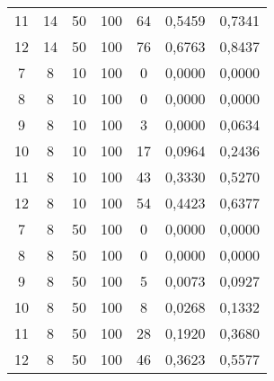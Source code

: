 \begin{table}[H]
\begin{tabular}{@{}ccccccc@{}}
11 & 14                                                    & 50                                                        & 100 & 64 & 0,5459        & 0,7341       \\
12 & 14                                                    & 50                                                        & 100 & 76 & 0,6763        & 0,8437       \\
7  & 8                                                     & 10                                                        & 100 & 0  & 0,0000        & 0,0000       \\
8  & 8                                                     & 10                                                        & 100 & 0  & 0,0000        & 0,0000       \\
9  & 8                                                     & 10                                                        & 100 & 3  & 0,0000        & 0,0634       \\
10 & 8                                                     & 10                                                        & 100 & 17 & 0,0964        & 0,2436       \\
11 & 8                                                     & 10                                                        & 100 & 43 & 0,3330        & 0,5270       \\
12 & 8                                                     & 10                                                        & 100 & 54 & 0,4423        & 0,6377       \\
7  & 8                                                     & 50                                                        & 100 & 0  & 0,0000        & 0,0000       \\
8  & 8                                                     & 50                                                        & 100 & 0  & 0,0000        & 0,0000       \\
9  & 8                                                     & 50                                                        & 100 & 5  & 0,0073        & 0,0927       \\
10 & 8                                                     & 50                                                        & 100 & 8  & 0,0268        & 0,1332       \\
11 & 8                                                     & 50                                                        & 100 & 28 & 0,1920        & 0,3680       \\
12 & 8                                                     & 50                                                        & 100 & 46 & 0,3623        & 0,5577       \\ \bottomrule
\end{tabular}
\end{table}




